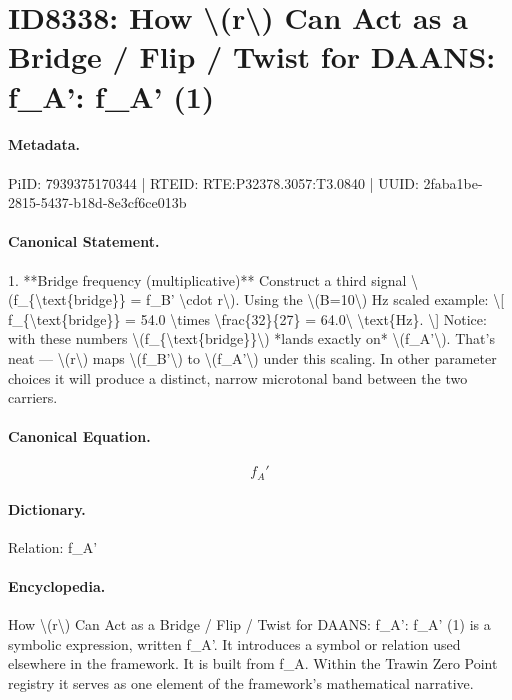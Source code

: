 \section*{ID8338: How \textbackslash{}(r\textbackslash{}) Can Act as a Bridge / Flip / Twist for DAANS: f\_A': f\_A' (1)}
\paragraph{Metadata.}
PiID: 7939375170344 | RTEID: RTE:P32378.3057:T3.0840 | UUID: 2faba1be-2815-5437-b18d-8e3cf6ce013b

\paragraph{Canonical Statement.}
1. **Bridge frequency (multiplicative)** Construct a third signal \textbackslash{}(f\_\{\textbackslash{}text\{bridge\}\} = f\_B' \textbackslash{}cdot r\textbackslash{}). Using the \textbackslash{}(B=10\textbackslash{}) Hz scaled example: \textbackslash{}[ f\_\{\textbackslash{}text\{bridge\}\} = 54.0 \textbackslash{}times \textbackslash{}frac\{32\}\{27\} = 64.0\textbackslash{} \textbackslash{}text\{Hz\}. \textbackslash{}] Notice: with these numbers \textbackslash{}(f\_\{\textbackslash{}text\{bridge\}\}\textbackslash{}) *lands exactly on* \textbackslash{}(f\_A'\textbackslash{}). That’s neat — \textbackslash{}(r\textbackslash{}) maps \textbackslash{}(f\_B'\textbackslash{}) to \textbackslash{}(f\_A'\textbackslash{}) under this scaling. In other parameter choices it will produce a distinct, narrow microtonal band between the two carriers.

\paragraph{Canonical Equation.}
\[
f_A'
\]

\paragraph{Dictionary.}
Relation: f\_A'

\paragraph{Encyclopedia.}
How \textbackslash{}(r\textbackslash{}) Can Act as a Bridge / Flip / Twist for DAANS: f\_A': f\_A' (1) is a symbolic expression, written f\_A'. It introduces a symbol or relation used elsewhere in the framework. It is built from f\_A. Within the Trawin Zero Point registry it serves as one element of the framework's mathematical narrative.
